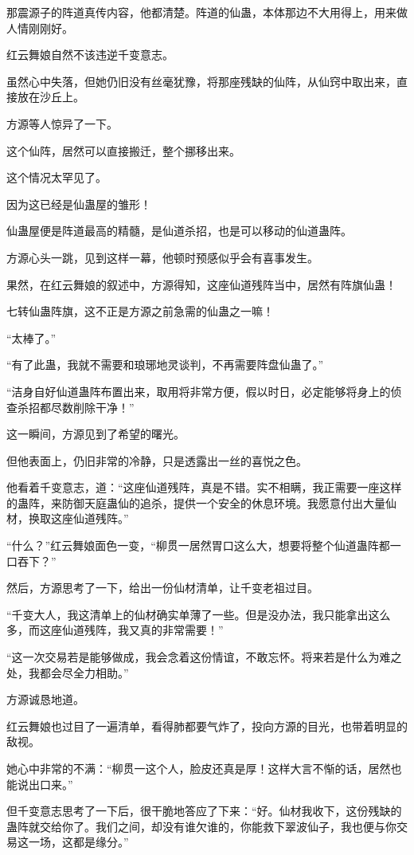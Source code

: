 \begin{this_body}
那震源子的阵道真传内容，他都清楚。阵道的仙蛊，本体那边不大用得上，用来做人情刚刚好。

红云舞娘自然不该违逆千变意志。

虽然心中失落，但她仍旧没有丝毫犹豫，将那座残缺的仙阵，从仙窍中取出来，直接放在沙丘上。

方源等人惊异了一下。

这个仙阵，居然可以直接搬迁，整个挪移出来。

这个情况太罕见了。

因为这已经是仙蛊屋的雏形！

仙蛊屋便是阵道最高的精髓，是仙道杀招，也是可以移动的仙道蛊阵。

方源心头一跳，见到这样一幕，他顿时预感似乎会有喜事发生。

果然，在红云舞娘的叙述中，方源得知，这座仙道残阵当中，居然有阵旗仙蛊！

七转仙蛊阵旗，这不正是方源之前急需的仙蛊之一嘛！

“太棒了。”

“有了此蛊，我就不需要和琅琊地灵谈判，不再需要阵盘仙蛊了。”

“洁身自好仙道蛊阵布置出来，取用将非常方便，假以时日，必定能够将身上的侦查杀招都尽数削除干净！”

这一瞬间，方源见到了希望的曙光。

但他表面上，仍旧非常的冷静，只是透露出一丝的喜悦之色。

他看着千变意志，道：“这座仙道残阵，真是不错。实不相瞒，我正需要一座这样的蛊阵，来防御天庭蛊仙的追杀，提供一个安全的休息环境。我愿意付出大量仙材，换取这座仙道残阵。”

“什么？”红云舞娘面色一变，“柳贯一居然胃口这么大，想要将整个仙道蛊阵都一口吞下？”

然后，方源思考了一下，给出一份仙材清单，让千变老祖过目。

“千变大人，我这清单上的仙材确实单薄了一些。但是没办法，我只能拿出这么多，而这座仙道残阵，我又真的非常需要！”

“这一次交易若是能够做成，我会念着这份情谊，不敢忘怀。将来若是什么为难之处，我都会尽全力相助。”

方源诚恳地道。

红云舞娘也过目了一遍清单，看得肺都要气炸了，投向方源的目光，也带着明显的敌视。

她心中非常的不满：“柳贯一这个人，脸皮还真是厚！这样大言不惭的话，居然也能说出口来。”

但千变意志思考了一下后，很干脆地答应了下来：“好。仙材我收下，这份残缺的蛊阵就交给你了。我们之间，却没有谁欠谁的，你能救下翠波仙子，我也便与你交易这一场，这都是缘分。”


\end{this_body}
